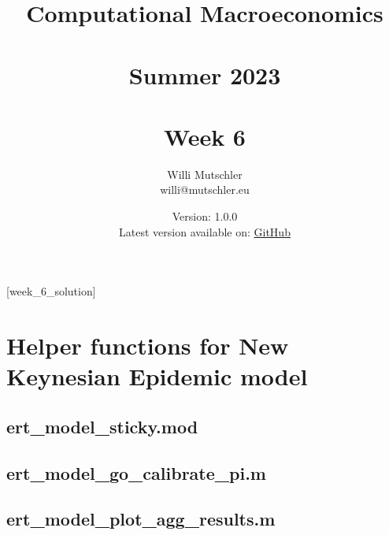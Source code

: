 
\newif\ifDisplaySolutions\DisplaySolutionstrue


\title{Computational Macroeconomics\\~\\Summer 2023\\~\\Week 6}
\author{Willi Mutschler\\willi@mutschler.eu}
\date{Version: 1.0.0\\Latest version available on: \href{https://github.com/wmutschl/Computational-Macroeconomics/releases/latest/download/week_6.pdf}{GitHub}}
\maketitle\thispagestyle{empty}

\newpage
{}[week_6_solution]
\tableofcontents\thispagestyle{empty}\newpage

\setcounter{page}{1}

\printbibliography

\appendix
\section{Helper functions for New Keynesian Epidemic model}
\subsection{ert\_model\_sticky.mod\label{app:ert_model_sticky}}


\subsection{ert\_model\_go\_calibrate\_pi.m\label{app:ert_model_go_calibrate_pi}}


\subsection{ert\_model\_plot\_agg\_results.m\label{app:ert_model_plot_agg_results}}


